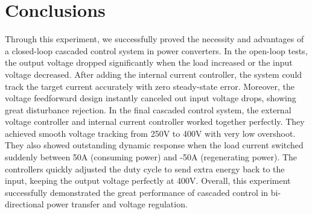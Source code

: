 \documentclass{article}
\begin{document}
\section*{Conclusions}
Through this experiment, we successfully proved the necessity and advantages of a closed-loop cascaded control system in power converters. In the open-loop tests, the output voltage dropped significantly when the load increased or the input voltage decreased. After adding the internal current controller, the system could track the target current accurately with zero steady-state error. Moreover, the voltage feedforward design instantly canceled out input voltage drops, showing great disturbance rejection. In the final cascaded control system, the external voltage controller and internal current controller worked together perfectly. They achieved smooth voltage tracking from 250V to 400V with very low overshoot. They also showed outstanding dynamic response when the load current switched suddenly between 50A (consuming power) and -50A (regenerating power). The controllers quickly adjusted the duty cycle to send extra energy back to the input, keeping the output voltage perfectly at 400V. Overall, this experiment successfully demonstrated the great performance of cascaded control in bi-directional power transfer and voltage regulation.
\end{document}
